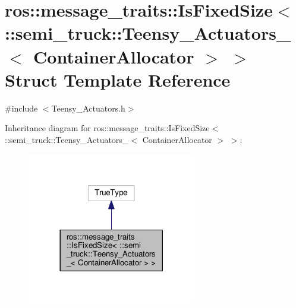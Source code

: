 \hypertarget{structros_1_1message__traits_1_1_is_fixed_size_3_01_1_1semi__truck_1_1_teensy___actuators___3_01_container_allocator_01_4_01_4}{}\section{ros\+:\+:message\+\_\+traits\+:\+:Is\+Fixed\+Size$<$ \+:\+:semi\+\_\+truck\+:\+:Teensy\+\_\+\+Actuators\+\_\+$<$ Container\+Allocator $>$ $>$ Struct Template Reference}
\label{structros_1_1message__traits_1_1_is_fixed_size_3_01_1_1semi__truck_1_1_teensy___actuators___3_01_container_allocator_01_4_01_4}


{\ttfamily \#include $<$Teensy\+\_\+\+Actuators.\+h$>$}



Inheritance diagram for ros\+:\+:message\+\_\+traits\+:\+:Is\+Fixed\+Size$<$ \+:\+:semi\+\_\+truck\+:\+:Teensy\+\_\+\+Actuators\+\_\+$<$ Container\+Allocator $>$ $>$\+:\nopagebreak
\begin{figure}[H]
\begin{center}
\leavevmode
\includegraphics[width=209pt]{structros_1_1message__traits_1_1_is_fixed_size_3_01_1_1semi__truck_1_1_teensy___actuators___3_012a97eaa163c25a98b0c76764d340d2a7}
\end{center}
\end{figure}


